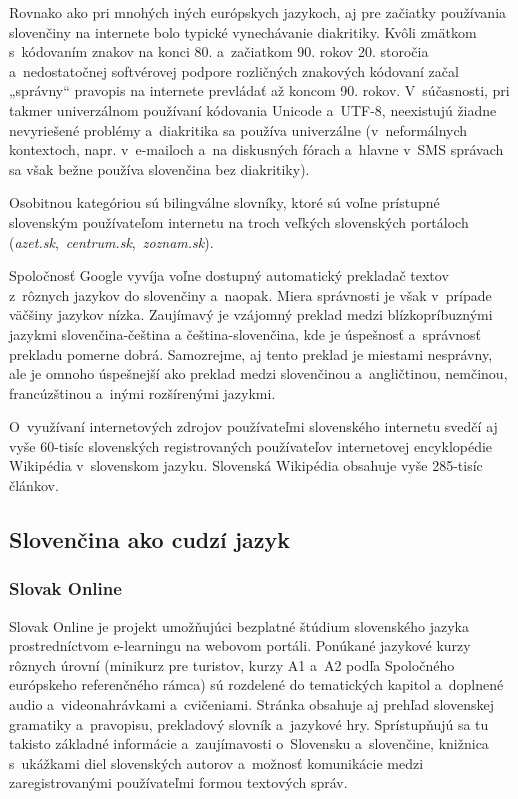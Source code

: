 \begin{multicols}{2}
Rovnako ako pri mnohých iných európskych jazykoch, aj pre začiatky
používania slovenčiny na internete\cite{f5} bolo typické vynechávanie diakritiky. Kvôli
zmätkom s~kódovaním znakov na konci 80. a~začiatkom 90. rokov 20.
storočia a~nedostatočnej softvérovej podpore rozličných znakových
kódovaní začal „správny“ pravopis na internete prevládať až
koncom 90. rokov. V~súčasnosti, pri takmer univerzálnom používaní
kódovania Unicode a~UTF-8, neexistujú žiadne nevyriešené problémy
a~diakritika sa používa univerzálne (v~neformálnych kontextoch,
napr. v~e-mailoch a~na diskusných fórach a~hlavne v~SMS správach
sa však bežne používa slovenčina bez diakritiky).

Osobitnou kategóriou sú bilingválne slovníky, ktoré sú voľne
prístupné slovenským používateľom internetu na troch veľkých
slovenských portáloch (\emph{azet.sk},~\emph{centrum.sk},~\emph{zoznam.sk}).

Spoločnosť Google vyvíja voľne dostupný automatický prekladač
textov z~rôznych jazykov do slovenčiny a~naopak. Miera správnosti je
však v~prípade väčšiny jazykov nízka. Zaujímavý je vzájomný
preklad medzi blízkopríbuznými jazykmi slovenčina-čeština a
čeština-slovenčina, kde je úspešnosť a~správnosť prekladu
pomerne dobrá. Samozrejme, aj tento preklad je miestami nesprávny, ale je
omnoho úspešnejší ako preklad medzi slovenčinou a~angličtinou,
nemčinou, francúzštinou a~inými rozšírenými jazykmi.

O~využívaní internetových zdrojov používateľmi slovenského
internetu svedčí aj vyše 60-tisíc slovenských registrovaných
používateľov internetovej encyklopédie Wikipédia v~slovenskom
jazyku. Slovenská Wikipédia obsahuje vyše 285-tisíc
článkov.

\subsection{Slovenčina ako cudzí jazyk}
\subsubsection{Slovak Online}
Slovak Online\cite{f6} je projekt umožňujúci bezplatné štúdium
slovenského jazyka prostredníctvom e-learningu na webovom portáli. Ponúkané jazykové
kurzy rôznych úrovní (minikurz pre turistov, kurzy A1 a~A2 podľa
Spoločného európskeho referenčného rámca) sú rozdelené do
tematických kapitol a~doplnené audio a~videonahrávkami a~cvičeniami.
Stránka obsahuje aj prehľad slovenskej gramatiky a~pravopisu,
prekladový slovník a~jazykové hry. Sprístupňujú sa tu takisto základné
informácie a~zaujímavosti o~Slovensku a~slovenčine, knižnica
s~ukážkami diel slovenských autorov a~možnosť komunikácie medzi
zaregistrovanými používateľmi formou textových správ.


\end{multicols}

